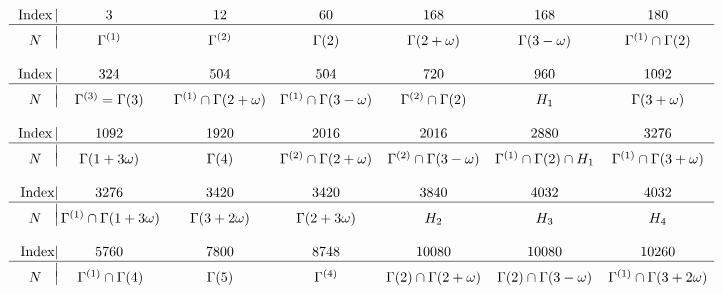 \documentclass[11pt]{amsart}
\theoremstyle{definition}
\theoremstyle{remark}
\begin{document}
\begin{table}[h]
\begin{center}
\caption{Normal subgroups $N$ of $\Gamma$ of index less than $20000$}
\label{GammaMore}

\vspace{-10pt}

\begin{tiny}
\[
\begin{array}{c@{|}cccccc}
\mbox{Index}& 3& 12& 60& 168& 168& 180\\
\hline
\vspace{-6.5pt} & & & & & & \\
N&\Gamma^{(1)}&\Gamma^{(2)}&\Gamma(2)&\Gamma(2+\omega)
&\Gamma(3-\omega)&\Gamma^{(1)}\cap\Gamma(2)\\
\multicolumn{2}{c}{}\\
\mbox{Index} & 324& 504 & 504& 720& 960& 1092\\
\hline
\vspace{-6.5pt} & & & & & & \\
N &\Gamma^{(3)}=\Gamma(3)&\Gamma^{(1)}\cap\Gamma(2+\omega)
&\Gamma^{(1)}\cap\Gamma(3-\omega)&\Gamma^{(2)}\cap\Gamma(2)&H_1&\Gamma(3+\omega)\\
\multicolumn{2}{c}{}\\
\mbox{Index}&1092 & 1920& 2016& 2016 & 2880& 3276\\
\hline
\vspace{-6.5pt} & & & & & & \\
N
&\Gamma(1+3\omega)&\Gamma(4)&\Gamma^{(2)}\cap\Gamma(2+\omega)&\Gamma^{(2)}\cap\Gamma(3-\omega)
&\Gamma^{(1)}\cap\Gamma(2)\cap H_1& \Gamma^{(1)}\cap\Gamma(3+\omega)\\
\multicolumn{2}{c}{}\\\
\mbox{Index}
& 3276& 3420& 3420& 3840& 4032& 4032\\
\hline
\vspace{-6.5pt} & & & & & & \\
N
& \, \Gamma^{(1)}\cap\Gamma(1+3\omega)&\Gamma(3+2\omega)&\Gamma(2+3\omega)&H_2&H_3&H_4\\
\multicolumn{2}{c}{}\\\
\mbox{Index} & 5760& 7800& 8748& 10080& 10080& 10260\\
\hline
\vspace{-6.5pt} & & & & & & \\
N& \, \Gamma^{(1)}\cap\Gamma(4)&\Gamma(5)&\Gamma^{(4)}&\Gamma(2)\cap\Gamma(2+\omega)&
\Gamma(2)\cap\Gamma(3-\omega)&\Gamma^{(1)}\cap\Gamma(3+2\omega)
\\

\end{array}\]
\end{tiny}
\end{center}
\end{table}
\end{document}
